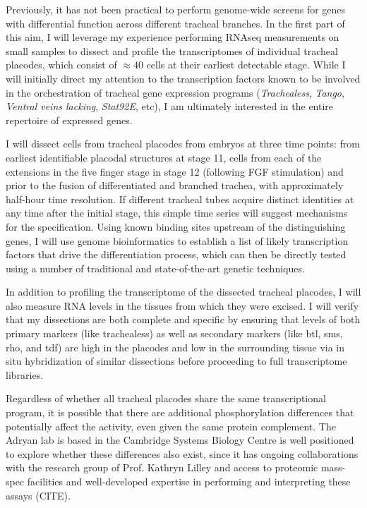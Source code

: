 \documentclass{proposal}
\begin{document}
Previously, it has not been practical to perform genome-wide screens for genes with differential function across different tracheal branches.
In the first part of this aim, I will leverage my experience performing RNAseq measurements on small samples to dissect and profile the transcriptomes of individual tracheal placodes, which consist of $\approx$40 cells at their earliest detectable stage.
While I will initially direct my attention to the transcription factors known to be involved in the orchestration of tracheal gene expression programs ({\em Trachealess}, {\em Tango}, {\em Ventral veins lacking}, {\em Stat92E}, etc), I am ultimately interested in the entire repertoire of expressed genes.

I will dissect cells from tracheal placodes from embryos at three time points: from earliest identifiable placodal structures at stage 11, cells from each of the extensions in the five finger stage in stage 12 (following FGF stimulation) and prior to the fusion of differentiated and branched trachea, with approximately half-hour time resolution.
If different tracheal tubes acquire distinct identities at any time after the initial stage, this simple time series will suggest mechanisms for the specification.
Using known binding sites upstream of the distinguishing genes, I will use genome bioinformatics to establish a list of likely transcription factors that drive the differentiation process, which can then be directly tested using a number of traditional and state-of-the-art genetic techniques.

In addition to profiling the transcriptome of the dissected tracheal placodes, I will also measure RNA levels in the tissues from which they were excised.
I will verify that my dissections are both complete and specific by ensuring that levels of both primary markers (like trachealess) as well as secondary markers (like btl, sms, rho, and tdf) are high in the placodes and low in the surrounding tissue via in situ hybridization of similar dissections before proceeding to full transcriptome libraries.


Regardless of whether all tracheal placodes share the same transcriptional program, it is possible that there are additional phosphorylation differences that potentially affect the activity, even given the same protein complement.
The Adryan lab is based in the Cambridge Systems Biology Centre is well positioned to explore whether these differences also exist, since it has ongoing collaborations with the research group of Prof.  Kathryn Lilley and access to proteomic mass-spec facilities and well-developed expertise in performing and interpreting these assays (CITE).
\end{document}

